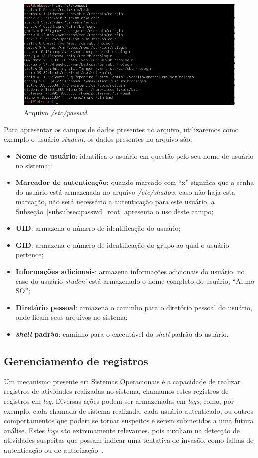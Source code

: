 \documentclass[
    12pt,				%
    oneside,   	        %
    a4paper,			%
    english,			%
    french,				%
    spanish,			%
    brazil,				%
    ]{pacotes/abntex2}
\begin{document}
\begin{figure}[H]
  \centering
  \includegraphics[scale=0.7]{figuras/passwd.png}
  \caption{Arquivo \textit{/etc/passwd}.}
  \label{fig:passwd}
\end{figure}

Para apresentar os campos de dados presentes no arquivo, utilizaremos como exemplo o usuário \textit{student}, os dados presentes no arquivo são:

\begin{itemize}
    \item \textbf{Nome de usuário}: identifica o usuário em questão pelo seu nome de usuário no sistema;
    \item \textbf{Marcador de autenticação}: quando marcado com ``x'' significa que a senha do usuário está armazenada no arquivo \textit{/etc/shadow}, caso não haja esta marcação, não será necessário a autenticação para este usuário, a Subseção~\ref{subsubsec:passwd_root} apresenta o uso deste campo;
    \item \textbf{UID}: armazena o número de identificação do usuário;
    \item \textbf{GID}: armazena o número de identificação do grupo ao qual o usuário pertence;
    \item \textbf{Informações adicionais}: armazena informações adicionais do usuário, no caso do usuário \textit{student} está armazenado o nome completo do usuário, ``Aluno SO'';
    \item \textbf{Diretório pessoal}: armazena o caminho para o diretório pessoal do usuário, onde ficam seus arquivos no sistema;
    \item \textbf{\textit{shell} padrão}: caminho para o executável do \textit{shell} padrão do usuário.
\end{itemize}

\subsection{Gerenciamento de registros}
Um mecanismo presente em Sistemas Operacionais é a capacidade de realizar registros de atividades realizadas no sistema, chamamos estes registros de registros em \textit{log}. Diversas ações podem ser armazenadas em \textit{logs}, como, por exemplo, cada chamada de sistema realizada, cada usuário autenticado, ou outros comportamentos que podem se tornar suspeitos e serem submetidos a uma futura análise. Estes \textit{logs} são extremamente relevantes, pois auxiliam na detecção de atividades suspeitas que possam indicar uma tentativa de invasão, como falhas de autenticação ou de autorização~\cite{silberschatz2015}.
\end{document}

